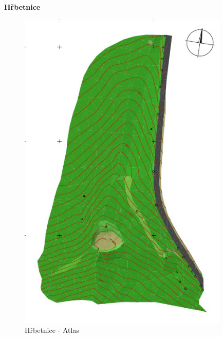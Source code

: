 \documentclass[a4paper, 12pt]{article}
\begin{document}
\textbf{Hřbetnice}
\begin{figure}[h]
	\centering
	\includegraphics[width=10cm]{dmt_atlas.jpg}
	\caption{Hřbetnice - Atlas}
\end{figure}
\end{document}
